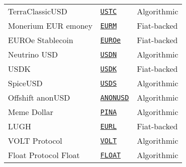\begin{tabular}{lll}
TerraClassicUSD & \href{https://etherscan.io/address/0xa47c8bf37f92aBed4A126BDA807A7b7498661acD}{\tt USTC} & Algorithmic \\
Monerium EUR emoney & \href{https://etherscan.io/address/0x3231Cb76718CDeF2155FC47b5286d82e6eDA273f}{\tt EURM} & Fiat-backed \\
EUROe Stablecoin & \href{https://etherscan.io/address/0x820802Fa8a99901F52e39acD21177b0BE6EE2974}{\tt EUROe} & Fiat-backed \\
Neutrino USD & \href{https://etherscan.io/address/0x674C6Ad92Fd080e4004b2312b45f796a192D27a0}{\tt USDN} & Algorithmic \\
USDK & \href{https://etherscan.io/address/0x1c48f86ae57291F7686349F12601910BD8D470bb}{\tt USDK} & Fiat-backed \\
SpiceUSD & \href{https://etherscan.io/address/0x45fDb1b92a649fb6A64Ef1511D3Ba5Bf60044838}{\tt USDS} & Algorithmic \\
Offshift anonUSD & \href{https://etherscan.io/address/0x5a7E6C8204A1359DB9AAcab7bA5Fc309B7981eFd}{\tt ANONUSD} & Algorithmic \\
Meme Dollar & \href{https://etherscan.io/address/0x02814F435dD04e254Be7ae69F61FCa19881a780D}{\tt PINA} & Algorithmic \\
LUGH & \href{https://etherscan.io/address/0xA967Dd943B336680540011536E7D8c3d33333515}{\tt EURL} & Fiat-backed \\
VOLT Protocol & \href{https://etherscan.io/address/0x559eBC30b0E58a45Cc9fF573f77EF1e5eb1b3E18}{\tt VOLT} & Algorithmic \\
Float Protocol Float & \href{https://etherscan.io/address/0xb05097849BCA421A3f51B249BA6CCa4aF4b97cb9}{\tt FLOAT} & Algorithmic \\
\bottomrule
\end{tabular}
